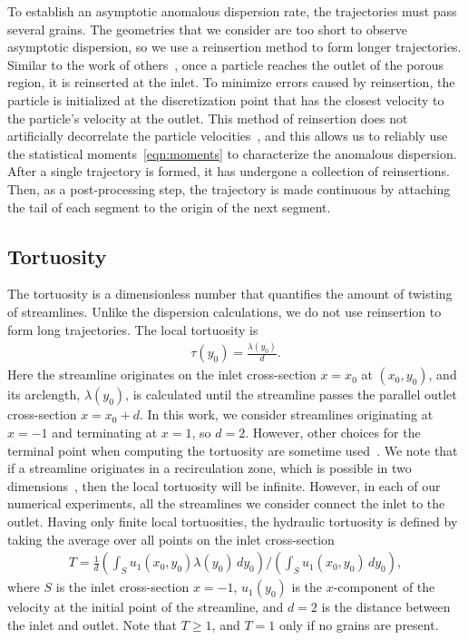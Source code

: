 \documentclass{jfm}
\begin{document}
To establish an asymptotic anomalous dispersion rate, the trajectories
must pass several grains. The geometries that we consider are too short
to observe asymptotic dispersion, so we use a reinsertion method to form
longer trajectories. Similar to the work of
others~\citep{dea-qua-bir-jua2018, puy-gou-den2019}, once a particle
reaches the outlet of the porous region, it is reinserted at the inlet.
To minimize errors caused by reinsertion, the particle is initialized at
the discretization point that has the closest velocity to the particle's
velocity at the outlet. This method of reinsertion does not artificially
decorrelate the particle velocities~\citep{puy-gou-den2019}, and this
allows us to reliably use the statistical moments~\eqref{eqn:moments} to
characterize the anomalous dispersion. After a single trajectory is
formed, it has undergone a collection of reinsertions.  Then, as a
post-processing step, the trajectory is made continuous by attaching the
tail of each segment to the origin of the next segment.

\subsection{Tortuosity}
The tortuosity is a dimensionless number that quantifies the amount of
twisting of streamlines. Unlike the dispersion calculations, we do not
use reinsertion to form long trajectories.  The local tortuosity is
\begin{align}
  \tau(y_0) = \frac{\lambda(y_0)}{d}.
  \label{eqn:localTort}
\end{align}
Here the streamline originates on the inlet cross-section $x=x_0$ at
$(x_0,y_0)$, and its arclength, $\lambda(y_0)$, is calculated until the
streamline passes the parallel outlet cross-section $x = x_0 + d$.  In
this work, we consider streamlines originating at $x=-1$ and terminating
at $x=1$, so $d=2$.  However, other choices for the terminal point when
computing the tortuosity are sometime used~\citep{dud-koz-mat2011}.  We
note that if a streamline originates in a recirculation zone, which is
possible in two dimensions~\citep{hig1985}, then the local tortuosity
will be infinite. However, in each of our numerical experiments, all the
streamlines we consider connect the inlet to the outlet. Having only
finite local tortuosities, the hydraulic tortuosity is defined by taking
the average over all points on the inlet cross-section
\begin{align}
  T = \frac{1}{d}\left(\int_{S}u_1(x_0,y_0)\lambda(y_0)\,dy_0 \right)
  \Bigg/
  \left(\int_{S}u_1(x_0,y_0)\,dy_0 \right),
  \label{eqn:tortuosity1}
\end{align} 
where $S$ is the inlet cross-section $x = -1$, $u_1(y_0)$ is the
$x$-component of the velocity at the initial point of the streamline,
and $d=2$ is the distance between the inlet and outlet.  Note that $T
\geq 1$, and $T=1$ only if no grains are present.
\end{document}
